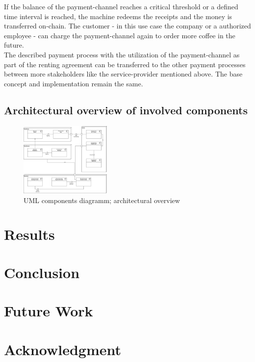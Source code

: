 \documentclass[conference]{IEEEtran}
\begin{document}
If the balance of the payment-channel reaches a critical threshold or a defined time interval is reached, the machine redeems the receipts and the money is transferred on-chain. The customer - in this use case the company or a authorized employee - can charge the payment-channel again to order more coffee in the future.\\
The described payment process with the utilization of the payment-channel as part of the renting agreement can be transferred to the other payment processes between more stakeholders like the service-provider mentioned above. The base concept and implementation remain the same.

\subsection{Architectural overview of involved components}
\textit{\lipsum[1-1]}

\begin{figure}[htbp]
 \centering
 \includegraphics[width=0.4\textwidth]{media/Architecture.png}
 \caption{UML components diagramm; architectural overview}
 \label{fig:architecture}
\end{figure}

\section{Results}
\textit{\lipsum[1-1]}


\section{Conclusion}
\textit{\lipsum[1-1]}

\section{Future Work}
\textit{\lipsum[1-1]}

\section*{Acknowledgment}
\textit{\lipsum[1-1]}





\end{document}

